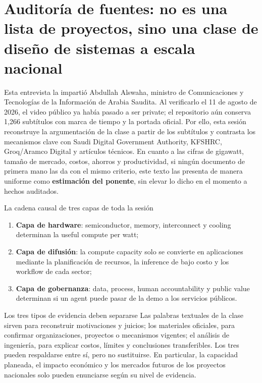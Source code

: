 \documentclass[a4paper]{article}
\begin{document}
\makecscover

\section{Auditoría de fuentes: no es una lista de proyectos, sino una clase de diseño de sistemas a escala nacional}

Esta entrevista la impartió Abdullah Alswaha, ministro de Comunicaciones y Tecnologías de la Información de Arabia Saudita. Al verificarlo el 11 de agosto de 2026, el video público ya había pasado a ser private; el repositorio aún conserva 1,266 subtítulos con marca de tiempo y la portada oficial. Por ello, esta sesión reconstruye la argumentación de la clase a partir de los subtítulos y contrasta los mecanismos clave con Saudi Digital Government Authority, KFSHRC, Groq/Aramco Digital y artículos técnicos. En cuanto a las cifras de gigawatt, tamaño de mercado, costos, ahorros y productividad, si ningún documento de primera mano las da con el mismo criterio, este texto las presenta de manera uniforme como \textbf{estimación del ponente}, sin elevar lo dicho en el momento a hechos auditados.

\begin{importantbox}{La cadena causal de tres capas de toda la sesión}
\begin{enumerate}
  \item \textbf{Capa de hardware}: semiconductor, memory, interconnect y cooling determinan la useful compute per watt;
  \item \textbf{Capa de difusión}: la compute capacity solo se convierte en aplicaciones mediante la planificación de recursos, la inference de bajo costo y los workflow de cada sector;
  \item \textbf{Capa de gobernanza}: data, process, human accountability y public value determinan si un agent puede pasar de la demo a los servicios públicos.
\end{enumerate}
\end{importantbox}

\begin{warningbox}{Los tres tipos de evidencia deben separarse}
Las palabras textuales de la clase sirven para reconstruir motivaciones y juicios; los materiales oficiales, para confirmar organizaciones, proyectos o mecanismos vigentes; el análisis de ingeniería, para explicar costos, límites y conclusiones transferibles. Los tres pueden respaldarse entre sí, pero no sustituirse. En particular, la capacidad planeada, el impacto económico y los mercados futuros de los proyectos nacionales solo pueden enunciarse según su nivel de evidencia.
\end{warningbox}
\end{document}
